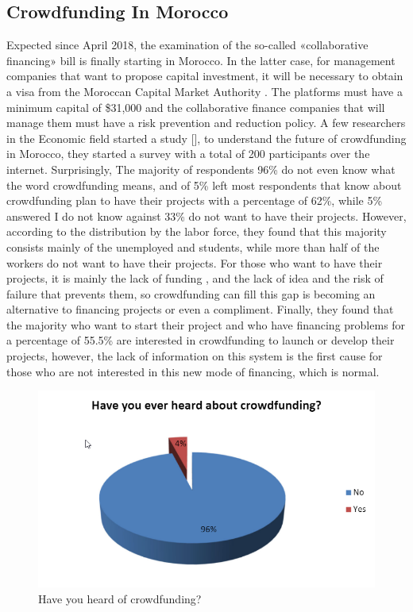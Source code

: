 \subsection*{ Crowdfunding In Morocco }
Expected since April 2018, the examination of the so-called «collaborative financing» bill is finally starting in Morocco. In the latter case, for management companies that want to propose capital investment, it will be necessary to obtain a visa from the Moroccan Capital Market Authority . The platforms must have a minimum capital of \$31,000 and the collaborative finance companies that will manage them must have a risk prevention and reduction policy.
A few researchers in the Economic field started a study [\cite{crowdMorocco}], to understand the future of crowdfunding in Morocco, they started a survey with a total of 200 participants over the internet. Surprisingly,  The majority of respondents 96\% do not even know what the word crowdfunding means, and of 5\% left most respondents that know about crowdfunding plan to have their projects with a percentage of 62\%, while 5\% answered I do not know against 33\% do not want to have their projects. However, according to the distribution by the labor force, they found that this majority consists mainly of the unemployed and students, while more than half of the workers do not want to have their projects. For those who want to have their projects, it is mainly the lack of funding , and the lack of idea and the risk of failure that prevents them, so crowdfunding can fill this gap is becoming an alternative to financing projects or even a compliment. Finally, they found that the majority who want to start their project and who have financing problems for a percentage of 55.5\% are interested in crowdfunding to launch or develop their projects, however, the lack of information on this system is the first cause for those who are not interested in this new mode of financing, which is normal.


\begin{figure}[!ht]
      \center
      \includegraphics[scale=0.60]{assets/heardCrowd.png}
      \caption{ Have you heard of crowdfunding? }
      \label{fig:heardCrowd}
\end{figure}

